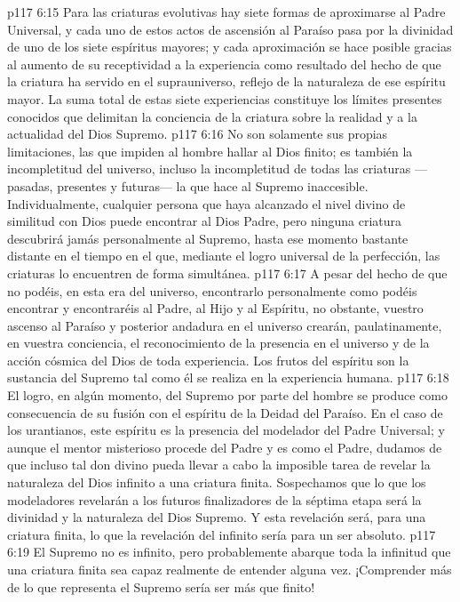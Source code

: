 \vs p117 6:15 \pc Para las criaturas evolutivas hay siete formas de aproximarse al Padre Universal, y cada uno de estos actos de ascensión al Paraíso pasa por la divinidad de uno de los siete espíritus mayores; y cada aproximación se hace posible gracias al aumento de su receptividad a la experiencia como resultado del hecho de que la criatura ha servido en el suprauniverso, reflejo de la naturaleza de ese espíritu mayor. La suma total de estas siete experiencias constituye los límites presentes conocidos que delimitan la conciencia de la criatura sobre la realidad y a la actualidad del Dios Supremo.
\vs p117 6:16 No son solamente sus propias limitaciones, las que impiden al hombre hallar al Dios finito; es también la incompletitud del universo, incluso la incompletitud de todas las criaturas ---pasadas, presentes y futuras--- la que hace al Supremo inaccesible. Individualmente, cualquier persona que haya alcanzado el nivel divino de similitud con Dios puede encontrar al Dios Padre, pero ninguna criatura  descubrirá jamás personalmente al Supremo, hasta ese momento bastante distante en el tiempo en el que, mediante el logro universal de la perfección,  las criaturas lo encuentren de forma simultánea.
\vs p117 6:17 A pesar del hecho de que no podéis, en esta era del universo, encontrarlo personalmente como podéis encontrar y encontraréis al Padre, al Hijo y al Espíritu, no obstante, vuestro ascenso al Paraíso y posterior andadura en el universo crearán, paulatinamente, en vuestra conciencia, el reconocimiento de la presencia en el universo y de la acción cósmica del Dios de toda experiencia. Los frutos del espíritu son la sustancia del Supremo tal como él se realiza en la experiencia humana.
\vs p117 6:18 El logro, en algún momento, del Supremo por parte del hombre se produce como consecuencia de su fusión con el espíritu de la Deidad del Paraíso. En el caso de los urantianos, este espíritu es la presencia del modelador del Padre Universal; y aunque el mentor misterioso procede del Padre y es como el Padre, dudamos de que incluso tal don divino pueda llevar a cabo la imposible tarea de revelar la naturaleza del Dios infinito a una criatura finita. Sospechamos que lo que los modeladores revelarán a los futuros finalizadores de la séptima etapa será la divinidad y la naturaleza del Dios Supremo. Y esta revelación será, para una criatura finita, lo que la revelación del infinito sería para un ser absoluto.
\vs p117 6:19 El Supremo no es infinito, pero probablemente abarque toda la infinitud que una criatura finita sea capaz realmente de entender alguna vez. ¡Comprender más de lo que representa el Supremo sería ser más que finito!
